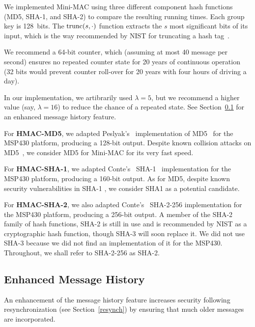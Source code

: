 We implemented Mini-MAC using three different component hash functions (MD5, SHA-1, and SHA-2) to compare the resulting running times.  
Each group key is 128~bits.  The $\hbox{trunc}(s,\cdot)$ function extracts 
the $s$ most significant bits of its input, which is the way recommended by NIST
for truncating a hash tag~\cite{nist107}.

We recommend a 64-bit counter, which (assuming at most 40 message per second) ensures no repeated counter state for 20 years
of continuous operation (32 bits would prevent counter roll-over for 20 years with four hours of driving a day).

In our implementation, we artibrarily used $\lambda = 5$, 
but we recommend a higher value (say, $\lambda = 16$) to reduce the chance of a repeated state.
See Section~\ref{history} for an enhanced message history feature.

For \textbf{HMAC-MD5},
we adapted Peslyak's~\cite{Peslyak} implementation of MD5~\cite{MD5} for the MSP430 platform, producing a 128-bit output. 
Despite known collision attacks on MD5~\cite{Wang-MD5}, we consider
MD5 for Mini-MAC for its very fast speed.  

For \textbf{HMAC-SHA-1},
we adapted Conte's~\cite{Conte-SHA1} SHA-1~\cite{FIPS-180-4} implementation for the MSP430 platform, producing a 160-bit output. 
As for MD5, despite known security vulnerabilities in SHA-1 \cite{Wang-SHA1}, 
we consider SHA1 as a potential candidate.


For \textbf{HMAC-SHA-2},
we also adapted Conte's~\cite{Conte-SHA256} SHA-2-256 implementation for the MSP430 platform, producing a 256-bit output. 
A member of the SHA-2 family of hash functions, SHA-2 is still in use and is recommended by NIST as a cryptographic hash function, 
though SHA-3 will soon replace it\cite{FIPS-180-4}. We did not use SHA-3 because we did not find an implementation of it
for the MSP430.  Throughout, we shall refer to SHA-2-256 as SHA-2.


\subsection{Enhanced Message History}
\label{history}

An enhancement of the message history feature increases security following resynchronization
(see Section~\ref{resynch}) by ensuring that much older messages are incorporated.

